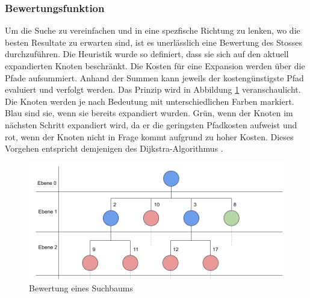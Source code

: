 \subsubsection{Bewertungsfunktion}
Um die Suche zu vereinfachen und in eine spezfische Richtung zu lenken, wo die besten Resultate zu erwarten sind, ist
es unerlässlich eine Bewertung des Stosses durchzuführen. Die Heuristik wurde so definiert, dass sie sich auf den
aktuell expandierten Knoten beschränkt. Die Kosten für eine Expansion werden über die Pfade aufsummiert. Anhand der
Summen kann jeweils der kostengünstigste Pfad evaluiert und verfolgt werden.
Das Prinzip wird in Abbildung \ref{fig:suchbaum_bewertung} veranschaulicht. Die Knoten werden je nach Bedeutung mit
unterschiedlichen Farben markiert. Blau sind sie, wenn sie bereits expandiert wurden. Grün, wenn der Knoten im nächsten
Schritt expandiert wird, da er die geringsten Pfadkosten aufweist und rot, wenn der Knoten nicht in Frage kommt aufgrund
zu hoher Kosten. Dieses Vorgehen entspricht demjenigen des Dijkstra-Algorithmus \cite{wiki.dijkstra:1}.
\begin{figure}[h!]
    \begin{center}
        \includegraphics[width=0.8\linewidth]{../common/03_billiard_ai/resources/28_suchbaum_bewertung.png}
    \end{center}
    \caption{Bewertung eines Suchbaums}
    \label{fig:suchbaum_bewertung}
\end{figure}

